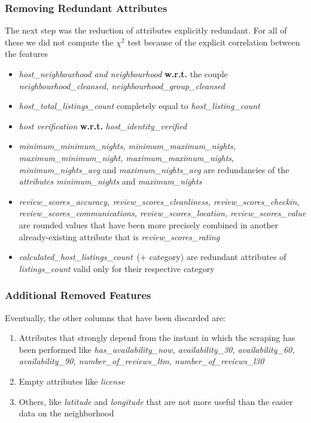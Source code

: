 \subsubsection{Removing Redundant Attributes}
The next step was the reduction of attributes explicitly redundant. For all of these we did not compute the $\chi^2$ test because of the explicit correlation between the features

\begin{itemize}
	\item \textit{host\_neighbourhood and neighbourhood} \textbf{w.r.t.} the couple \textit{neighbourhood\_cleansed, neighbourhood\_group\_cleansed}
	\item \textit{host\_total\_listings\_count} completely equal to \textit{host\_listing\_count}
	\item \textit{host verification} \textbf{w.r.t.} \textit{host\_identity\_verified}
	\item \textit{minimum\_minimum\_nights, minimum\_maximum\_nights, maximum\_minimum\_night, maximum\_maximum\_nights, minimum\_nights\_avg} and \textit{maximum\_nights\_avg} are redundancies of the \textit{attributes minimum\_nights} and \textit{maximum\_nights}
	\item \textit{review\_scores\_accuracy, review\_scores\_cleanliness, review\_scores\_checkin, review\_scores\_communications, review\_scores\_location, review\_scores\_value} are rounded values that have been more precisely combined in another already-existing attribute that is \textit{review\_scores\_rating}
	\item \textit{calculated\_host\_listings\_count} (+ category) are redundant attributes of \textit{listings\_count} valid only for their respective category
\end{itemize}

\subsubsection{Additional Removed Features}
Eventually, the other columns that have been discarded are:

\begin{enumerate}
	\item Attributes that strongly depend from the instant in which the scraping has been performed like \textit{has\_availability\_now, availability\_30, availability\_60, availability\_90, number\_of\_reviews\_ltm, number\_of\_reviews\_l30}
	\item Empty attributes like \textit{license}
	\item Others, like \textit{latitude} and \textit{longitude} that are not more useful than the easier data on the neighborhood
\end{enumerate}


